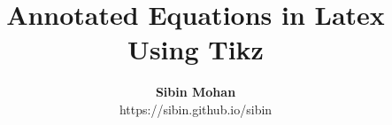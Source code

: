 \documentclass[letterpaper,twocolumn,10pt]{article}
\begin{document}
\title{Annotated Equations in Latex Using Tikz}

\author{
{\bf Sibin Mohan}\\
{https://sibin.github.io/sibin}
} %

\maketitle

\blindtext
\vspace{2\baselineskip}



\blindtext
\blindtext


\onecolumn

\blindtext


\blindtext


\blindtext
\end{document}
